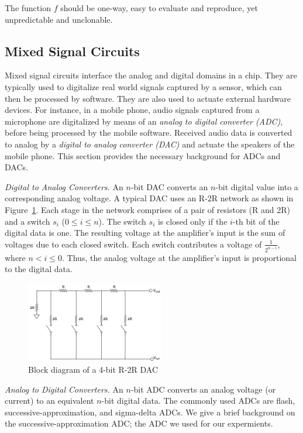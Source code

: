 The function $f$ should be one-way, easy to evaluate and reproduce, yet unpredictable
and unclonable. 

\subsection{Mixed Signal Circuits}
Mixed signal circuits interface the analog and digital domains in a chip. 
They are typically used to digitalize real world signals captured by
a sensor, which
can then be processed by software. They are also used to actuate external 
hardware devices. 
For instance, in a mobile phone, audio signals captured from 
a microphone are digitalized by means of an {\em analog to digital converter
(ADC)}, before being processed by the mobile software. Received audio data is
converted to analog by a {\em digital to analog converter (DAC)} and actuate the
speakers of the mobile phone. This section provides the necessary background
for ADCs and DACs.

{\flushleft \em Digital to Analog Converters.}
An $n$-bit DAC converts an $n$-bit digital value into a corresponding analog
voltage. A typical DAC uses an R-2R network as shown in Figure~\ref{fig:r2r}.
Each stage in the network comprises of a pair of 
resistors (R and 2R) and a switch $s_i$ 
($0 \le i \le n$). The switch $s_i$ is closed only if the $i$-th bit of the
digital data is one. The resulting voltage at the amplifier's input is the
sum of voltages due to each closed switch. 
Each switch contributes a voltage of $\frac{1}{2^{n-i}}$, 
where $n < i \le 0$. 
Thus, the analog voltage at the amplifier's input
is proportional to the digital data.

\begin{figure}
\includegraphics[width=6cm]{SA-ADC.png}
\centering
\caption{Block diagram of a 4-bit R-2R DAC\label{fig:r2r}}
\end{figure}

{\flushleft \em Analog to Digital Converters.}
An $n$-bit ADC converts an analog voltage (or current) to 
an equivalent $n$-bit digital data. The commonly used ADCs are
flash, successive-approximation, and sigma-delta ADCs. We give
a brief background on the successive-approximation ADC; the 
ADC we used for our expermients.

